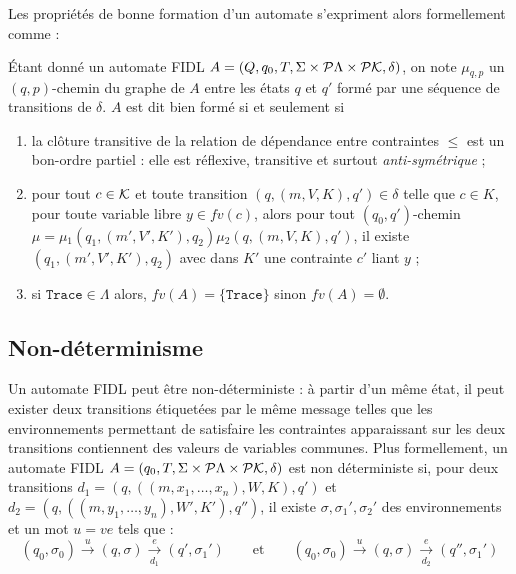 Les propri\'et\'es de bonne formation d'un automate s'expriment
alors formellement comme :

\begin{definition}
\label{def:automate-bien-forme}  \'Etant donn\'e un automate \textsf{FIDL}  $A= (Q,q_0,T,\Sigma
    \times{}{\cal P}\Lambda
    \times{}{\cal P}\mathcal{K},\delta)$, on note $\mu{}_{q,p}$ un 
    $(q,p)$-chemin du graphe de $A$ entre les \'etats $q$ et $q'$
    form\'e par une s\'equence de transitions de $\delta$.
 $A$ est dit bien form\'e si et seulement si
    \begin{enumerate}
      \item \label{prop-wf-circ} la cl\^oture transitive de la
      relation de d\'ependance entre contraintes $\leq$ est un
      bon-ordre partiel : elle est r\'eflexive,  transitive et
      surtout \emph{anti-sym\'etrique} ;
  \item \label{prof-wf-nofree} pour tout $c\in {\cal K}$ et toute
    transition $(q,(m,V,K),q')\in \delta$ telle que $c\in K$, pour toute
    variable libre $y\in fv(c)$, alors pour tout $(q_0,q')$-chemin $\mu{}=
    \mu{}_1 (q_1,(m',V',K'),q_2) \mu{}_2 (q,(m,V,K),q')$, il
    existe $(q_1,(m',V',K'),q_2)$ avec dans $K'$ une contrainte $c'$
    liant $y$ ;
  \item \label{prof-wf-trace} si $\mathtt{Trace} \in \Lambda$ alors,
  $fv(A) =  \{\mathtt{Trace}\}$ sinon $fv(A) = \emptyset$.  
\end{enumerate}
\end{definition}

\subsection{Non-d\'eterminisme}

Un automate \textsf{FIDL} peut \^etre non-d\'eterministe : \`a
partir d'un m\^eme \'etat, il peut exister deux transitions 
\'etiquet\'ees par le m\^eme message telles que les environnements
permettant de satisfaire les contraintes apparaissant sur les deux
transitions contiennent des valeurs de variables communes. Plus
formellement, un automate \textsf{FIDL} $A=(q_0,T,\Sigma \times{}{\cal P}\Lambda
\times{}{\cal P}\mathcal{K},\delta)$ est non d\'eterministe si, pour deux
transitions $d_1=(q,((m,x_1,\dots,x_n),
W,K),q')$ et $d_2=(q,((m,y_1,\dots,y_n),
W',K'),q'')$, il existe $\sigma,\sigma_1',\sigma_2'$ des
environnements et un mot $u=ve$ tels que :
$$
(q_0,\sigma_0)\xrightarrow{u}(q,\sigma)\xrightarrow[d_1]{e} (q',\sigma_1') \qquad \mbox{et} \qquad (q_0,\sigma_0)\xrightarrow{u}(q,\sigma)\xrightarrow[d_2]{e} (q'',\sigma_1')
$$

